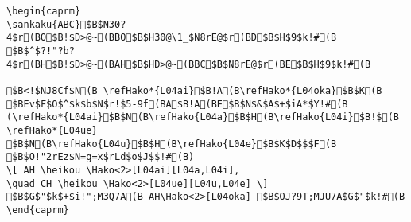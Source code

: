 \begin{verbatim}
\begin{caprm}
\sankaku{ABC}$B$N30?4$r(BO$B!$D>@~(BBO$B$H30@\1_$N8rE@$r(BD$B$H$9$k!#(B
$B$^$?!"?b?4$r(BH$B!$D>@~(BAH$B$HD>@~(BBC$B$N8rE@$r(BE$B$H$9$k!#(B

$B<!$NJ8Cf$N(B \refHako*{L04ai}$B!A(B\refHako*{L04oka}$B$K(B
$BEv$F$O$^$k$b$N$r!$5-9f(BA$B!A(BE$B$N$&$A$+$iA*$Y!#(B
(\refHako*{L04ai}$B$N(B\refHako{L04a}$B$H(B\refHako{L04i}$B!$(B
\refHako*{L04ue} $B$N(B\refHako{L04u}$B$H(B\refHako{L04e}$B$K$D$$$F(B
$B$O!"2rEz$N=g=x$rLd$o$J$$!#(B)
\[ AH \heikou \Hako<2>[L04ai][L04a,L04i], 
\quad CH \heikou \Hako<2>[L04ue][L04u,L04e] \]
$B$G$"$k$+$i!";M3Q7A(B AH\Hako<2>[L04oka] $B$OJ?9T;MJU7A$G$"$k!#(B
\end{caprm}
\end{verbatim}
